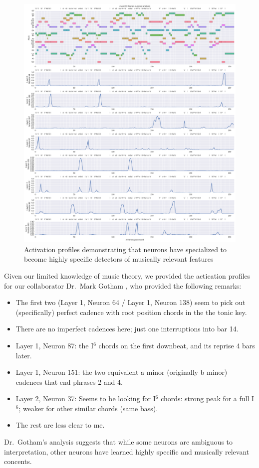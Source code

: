 \begin{figure}[tb]
    \centering
    \includegraphics[width=1.0\linewidth]{model-analysis-cells-individual.png}
    \caption{Activation profiles demonstrating that neurons have specialized to become
    highly specific detectors of musically relevant features}
    \label{fig:model-analysis-cells-individual}
\end{figure}

Given our limited knowledge of music theory, we provided the actication
profiles for our collaborator Dr.\ Mark Gotham \citet{mark-analysis}, who
provided the following remarks:
\begin{itemize}
    \item The first two (Layer 1, Neuron 64 / Layer 1, Neuron 138) seem to pick out (specifically) perfect cadence
        with root position chords in the the tonic key.
    \item There are no imperfect cadences here; just one interruptions into bar 14.
    \item Layer 1, Neuron 87: the I$^6$ chords on the first downbeat, and its reprise 4 bars later.
    \item Layer 1, Neuron 151: the two equivalent a minor (originally b minor) cadences that end phrases 2 and 4.
    \item Layer 2, Neuron 37: Seems to be looking for I$^6$ chords: strong peak
        for a full I$^6$; weaker for other similar chords (same bass).
    \item The rest are less clear to me.
\end{itemize}
Dr.\ Gotham's analysis suggests that while some neurons are ambiguous to interpretation,
other neurons have learned highly specific and musically relevant concents.

